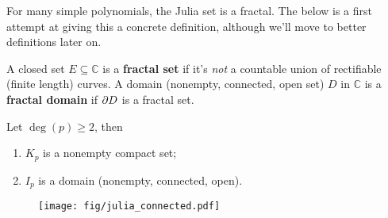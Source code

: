 \documentclass[twoside,10pt]{report}
\begin{document}
For many simple polynomials, the Julia set is a fractal. The below is a first attempt at giving this a concrete definition, although we'll move to better definitions later on.

\begin{defn}[]
A closed set $E \subseteq \mathbb{C}$ is a \textbf{fractal set} if it's \textit{not} a countable union of rectifiable (finite length) curves. A domain (nonempty, connected, open set) $D$ in $\mathbb{C}$ is a \textbf{fractal domain} if $\partial D$ is a fractal set.
\end{defn}


\begin{thrm}[]
Let $\deg(p) \geq 2$, then
\begin{enumerate}
	\item $K_{p}$ is a nonempty compact set;
	\item $I_{p}$ is a domain (nonempty, connected, open).
\end{enumerate}
\end{thrm}
\begin{figure}[H]
	\centering
	\texttt{[image: fig/julia\_connected.pdf]}
\end{figure}
\end{document}
